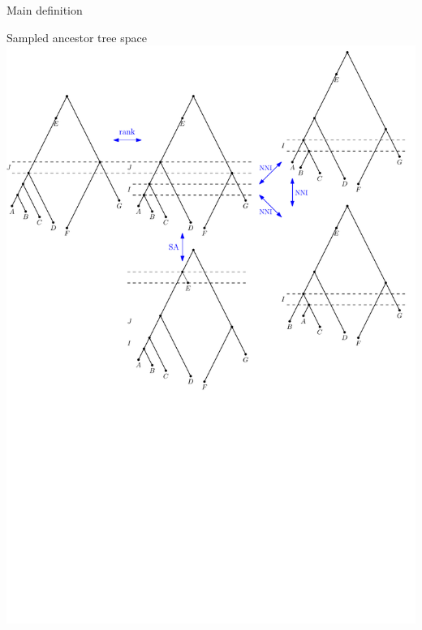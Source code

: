 \documentclass{beamer}
\theoremstyle{example}
\begin{document}
\begin{frame}{Main definition}
\begin{block}{Sampled ancestor tree space}
\includegraphics[width=0.8\framewidth]{SAT}
\end{block}
\end{frame}
\end{document}
